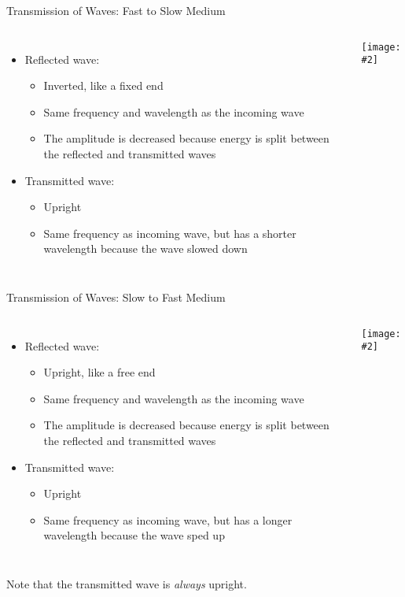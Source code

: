 \documentclass[12pt,aspectratio=169]{beamer}
\newcommand{\pic}[2]{\texttt{[image: \#2]}}
\begin{document}
\begin{frame}{Transmission of Waves: Fast to Slow Medium}
  \begin{columns}
    \begin{itemize}
    \item Reflected wave:
      \begin{itemize}
      \item Inverted, like a fixed end
      \item Same frequency and wavelength as the incoming wave
      \item The amplitude is decreased because energy is split between the
        reflected and transmitted waves
      \end{itemize}
    \item Transmitted wave:
      \begin{itemize}
      \item Upright
      \item Same frequency as incoming wave, but has a shorter wavelength
        because the wave slowed down
      \end{itemize}
    \end{itemize}
    
    \pic1{23}
  \end{columns}
\end{frame}


\begin{frame}{Transmission of Waves: Slow to Fast Medium}
  \begin{columns}
    \begin{itemize}
    \item Reflected wave:
      \begin{itemize}
      \item Upright, like a free end
      \item Same frequency and wavelength as the incoming wave
      \item The amplitude is decreased because energy is split between the
        reflected and transmitted waves
      \end{itemize}
    \item Transmitted wave:
      \begin{itemize}
      \item Upright
      \item Same frequency as incoming wave, but has a longer wavelength because
        the wave sped up
      \end{itemize}
    \end{itemize}
    
    \pic1{24}
  \end{columns}
  Note that the transmitted wave is \emph{always} upright.
\end{frame}
\end{document}
